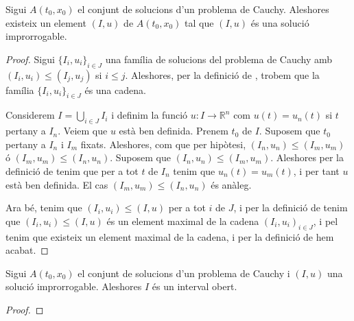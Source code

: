 \documentclass[../../Main.tex]{subfiles}
\begin{document}
	\begin{proposition}
		\label{prop:existeixen solucions improrrogables}
		Sigui \(A(t_{0},x_{0})\) el conjunt de solucions d'un problema de Cauchy.
		Aleshores existeix un element \((I,u)\) de \(A(t_{0},x_{0})\) tal que \((I,u)\) és una solució improrrogable.
		\begin{proof}
			Sigui \(\{I_{i},u_{i}\}_{i\in J}\) una família de solucions del problema de Cauchy amb \((I_{i},u_{i})\leq(I_{j},u_{j})\) si \(i\leq j\).
			Aleshores, per la definició de , trobem que la família \(\{I_{i},u_{i}\}_{i\in J}\) és una cadena.
			
			Considerem \(I=\bigcup_{i\in J}I_{i}\) i definim la funció \(u\colon I\longrightarrow\mathbb{R}^{n}\) com \(u(t)=u_{n}(t)\) si \(t\) pertany a \(I_{n}\).
			Veiem que \(u\) està ben definida.
			Prenem \(t_{0}\) de \(I\).
			Suposem que \(t_{0}\) pertany a \(I_{n}\) i \(I_{m}\) fixats.
			Aleshores, com que per hipòtesi, \((I_{n},u_{n})\leq(I_{m},u_{m})\) ó \((I_{m},u_{m})\leq(I_{n},u_{n})\).
			Suposem que \((I_{n},u_{n})\leq(I_{m},u_{m})\).
			Aleshores per la definició de  tenim que per a tot \(t\) de \(I_{n}\) tenim que \(u_{n}(t)=u_{m}(t)\), i per tant \(u\) està ben definida.
			El cas \((I_{m},u_{m})\leq(I_{n},u_{n})\) és anàleg.
			
			Ara bé, tenim que \((I_{i},u_{i})\leq(I,u)\) per a tot \(i\) de \(J\), i per la definició de  tenim que \((I_{i},u_{i})\leq(I,u)\) és un element maximal de la cadena \((I_{i},u_{i})_{i\in J}\), i pel  tenim que existeix un element maximal de la cadena, i per la definició de  hem acabat.
		\end{proof}
	\end{proposition}
	\begin{proposition}
		\label{prop:les solucions improrrogables estàn definides sobre intervals oberts}
		Sigui \(A(t_{0},x_{0})\) el conjunt de solucions d'un problema de Cauchy i \((I,u)\) una solució improrrogable.
		Aleshores \(I\) és un interval obert.
		\begin{proof}
%
		\end{proof}
	\end{proposition}
\end{document}
